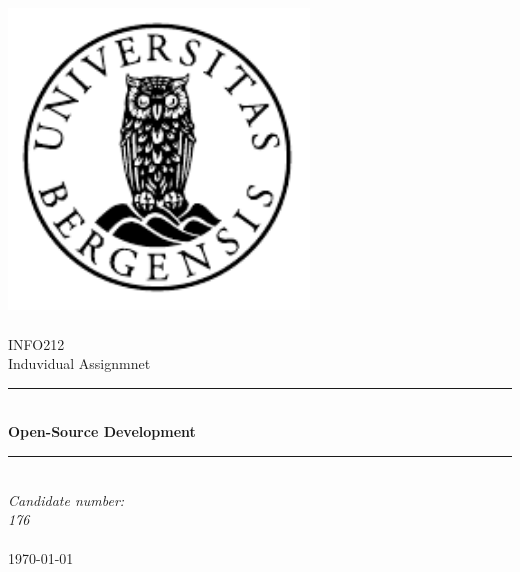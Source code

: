 \documentclass[12pt]{article}
\renewcommand{\maketitle}{}
\begin{document}
\maketitle

\newcommand{\blankpage}{\newpage{}\thispagestyle{empty}\mbox{}\newpage{}}
\newcommand{\HRule}{\rule{\linewidth}{0.5mm}}

\begin{titlepage}
\begin{center}
\includegraphics[width=8cm]{pic/uib-emblem-svart} \\[0.5cm]
\paragraph*{}

\textsc{\Large INFO212}\\[0.5cm]
\Large Induvidual Assignmnet\\[0.4cm]
\HRule{}\\[0.4cm]
{\huge \bfseries Open-Source Development}\\[0.5cm]
\HRule{}\\[1.0cm]

\emph{Candidate number:\\
      176}\\

      \paragraph*{}
      \end{center}
      \vfill
      \begin{center}
      {\large \today}
      \end{center}
      \end{titlepage}
\end{document}
